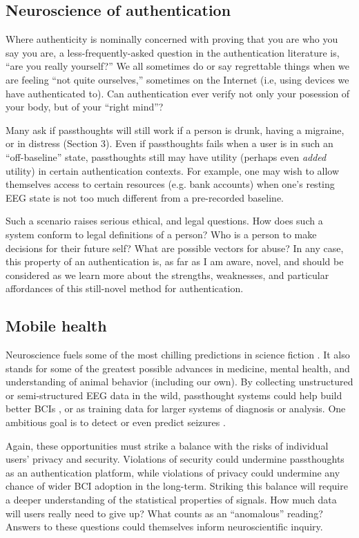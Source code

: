 \documentclass[sigconf]{acmart}
\begin{document}
\subsection{Neuroscience of authentication}
\label{sec:orgd64e9c8}

Where authenticity is nominally concerned with proving that you are who you say you are,
a less-frequently-asked question in the authentication literature is,
``are you really yourself?''
We all sometimes do or say regrettable things when we are feeling ``not quite ourselves,'' sometimes on the Internet (i.e, using devices we have authenticated to).
Can authentication ever verify not only your posession of your body, but of your ``right mind''?

Many ask if passthoughts will still work if a person is drunk, having a migraine, or in distress (Section 3). 
Even if passthoughts fails when a user is in such an ``off-baseline'' state, 
passthoughts still may have utility (perhaps even \emph{added} utility) in certain authentication contexts.
For example, one may wish to allow themselves access to certain resources (e.g. bank accounts) when one's resting EEG state is not too much different from a pre-recorded baseline.

Such a scenario raises serious ethical, and legal questions. 
How does such a system conform to legal definitions of a person?
Who is a person to make decisions for their future self?
What are possible vectors for abuse?
In any case, this property of an authentication is, as far as I am aware, novel, and should be considered as we learn more about the strengths, weaknesses, and particular affordances of this still-novel method for authentication.
\subsection{Mobile health}
\label{sec:org1da142c}
Neuroscience fuels some of the most chilling predictions in science fiction \cite{Welsh2011}.
It also stands for some of the greatest possible advances in medicine, mental health, and understanding of animal behavior (including our own).
By collecting unstructured or semi-structured EEG data in the wild, 
passthought systems could help build better BCIs \cite{Grierson2011a},
or as training data for larger systems of diagnosis or analysis. 
One ambitious goal is to detect or even predict seizures \cite{Mormann2006}.

Again, these opportunities must strike a balance with the risks of individual users' privacy and security.
Violations of security could undermine passthoughts as an authentication platform,
while violations of privacy could undermine any chance of wider BCI adoption in the long-term.
Striking this balance will require a deeper understanding of the statistical properties of signals. 
How much data will users really need to give up? 
What counts as an ``anomalous'' reading?
Answers to these questions could themselves inform neuroscientific inquiry.
\end{document}
